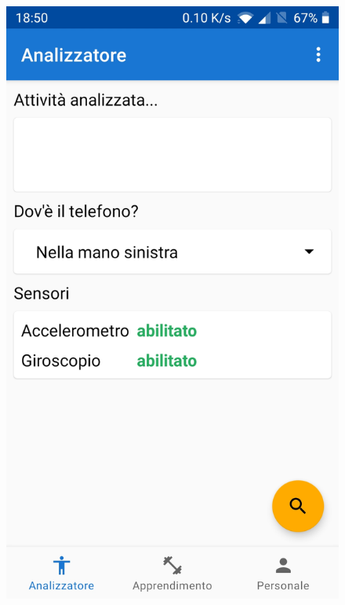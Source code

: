 \begin{figure}[H]
    \centering
    \includegraphics[scale = 0.1019]{assets/images/screenshots/1a_Init.jpg}

\end{figure}
